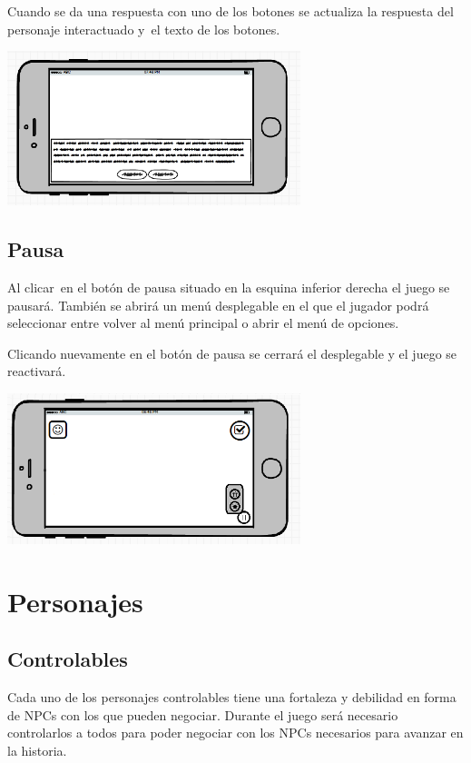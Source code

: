 {
Cuando se da una respuesta con uno de los botones se actualiza la respuesta del personaje interactuado y\ el texto de
los botones.\ \ }

 \includegraphics[width=3.36728in,height=1.77154in]{anexos/GDD/GDD-img008.png} 

\subsection[Pausa]{ Pausa}
\hypertarget{Toc484614223}{}{
Al clicar\ en el bot\'on de pausa situado en la esquina inferior derecha el juego se pausar\'a. Tambi\'en se abrir\'a un
men\'u desplegable en el que el jugador podr\'a seleccionar entre volver al men\'u principal o abrir el men\'u de
opciones.}

{
Clicando nuevamente en el bot\'on de pausa se cerrar\'a el desplegable y el juego se reactivar\'a.}

 \includegraphics[width=3.36029in,height=1.72756in]{anexos/GDD/GDD-img009.png} 

\section[Personajes]{ Personajes}
\label{personajes}
\hypertarget{Toc484614224}{}\subsection[Controlables]{ Controlables}
\hypertarget{Toc484614225}{}{
Cada uno de los personajes controlables tiene una fortaleza y debilidad en forma de NPCs con los que pueden negociar.
Durante el juego ser\'a necesario controlarlos a todos para poder negociar con los NPCs necesarios para avanzar en la
historia.}

